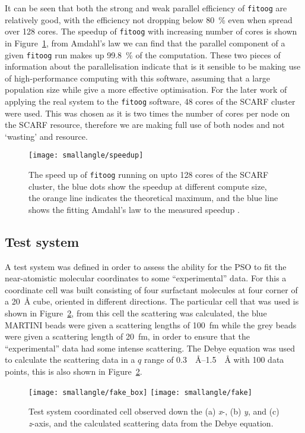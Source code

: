 It can be seen that both the strong and weak parallel efficiency of \texttt{fitoog} are relatively good, with the efficiency not dropping below \SI{80}{\percent} even when spread over 128 cores.
The speedup of \texttt{fitoog} with increasing number of cores is shown in Figure~\ref{fig:speedup}, from Amdahl's law \cite{amdahl_validity_1967} we can find that the parallel component of a given \texttt{fitoog} run makes up \SI{99.8}{\percent} of the computation.
These two pieces of information about the parallelisation indicate that is it sensible to be making use of high-performance computing with this software, assuming that a large population size while give a more effective optimisation.
For the later work of applying the real system to the \texttt{fitoog} software, 48 cores of the SCARF cluster were used.
This was chosen as it is two times the number of cores per node on the SCARF resource, therefore we are making full use of both nodes and not `wasting' and resource.
%
\begin{figure}
    \centering
    \texttt{[image: smallangle/speedup]}
    \caption{The speed up of \texttt{fitoog} running on upto 128 cores of the SCARF cluster, the blue dots show the speedup at different compute size, the orange line indicates the theoretical maximum, and the blue line shows the fitting Amdahl's law to the measured speedup \cite{amdahl_validity_1967}.}
    \label{fig:speedup}
\end{figure}
%

\subsection{Test system}
A test system was defined in order to assess the ability for the PSO to fit the near-atomistic molecular coordinates to some ``experimental'' data.
For this a coordinate cell was built consisting of four surfactant molecules at four corner of a \SI{20}{\angstrom} cube, oriented in different directions.
The particular cell that was used is shown in Figure~\ref{fig:test}, from this cell the scattering was calculated, the blue MARTINI beads were given a scattering lengths of \SI{100}{\femto\meter} while the grey beads were given a scattering length of \SI{20}{\femto\meter}, in order to ensure that the ``experimental'' data had some intense scattering.
The Debye equation was used to calculate the scattering data in a $q$ range of \SIrange{0.3}{1.5}{\per\angstrom} with 100 data points, this is also shown in Figure~\ref{fig:test}.
%
\begin{figure}
    \centering
    \texttt{[image: smallangle/fake\_box]}
    \texttt{[image: smallangle/fake]}
    \caption{Test system coordinated cell observed down the (a) \emph{x}-, (b) \emph{y}, and (c) \emph{z}-axis, and the calculated scattering data from the Debye equation.}
    \label{fig:test}
\end{figure}
%

